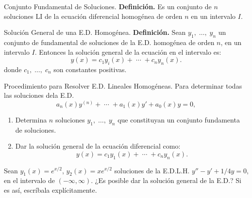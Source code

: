 \documentclass{beamer}
\begin{document}
\begin{frame}[t]
	\begin{block}{Conjunto Fundamental de Soluciones.}
		\textbf{Definición.} Es un conjunto de \(n\) soluciones LI de la ecuación diferencial homogénea de orden \(n\) en un intervalo \(I\).
	\end{block}
	\begin{block}{Solución General de una E.D. Homogénea.}
		\textbf{Definición.} Sean \(y_1, \;\ldots,\; y_n\) un conjunto de fundamental de soluciones de la E.D. homogénea de orden \(n\), en un intervalo \(I\). Entonces la solución general de la ecuación en el intervalo es:
		\[
			y(x) = c_1y_i(x) + \;\cdots\; +c_ny_n(x).
		\]
		donde \(c_1, \;\ldots,\; c_n\) son constantes positivas.
	\end{block}
\end{frame}

\begin{frame}[t]
	\begin{block}{Procedimiento para Resolver E.D. Lineales Homogéneas.}
		Para determinar todas las soluciones dela E.D.
		\[
			a_n(x) y^{(n)} + \;\cdots\; + a_1(x) y' +a_0(x) y =0,
		\]
		\vspace{-6mm}
		\begin{enumerate}
			\item Determina \(n\) soluciones \(y_1, \;\ldots,\; y_n\) que constituyan un conjunto fundamenta de soluciones.
			\item Dar la solución general de la ecuación diferencial como:
			\[
				y(x) = c_1y_1(x) + \;\cdots\; +c_ny_n(x).
			\]
		\end{enumerate}
	\end{block}
	\begin{example}
		Sean \(y_1(x) = e^{x/2}\), \(y_2(x) = xe^{x/2}\) soluciones de la E.D.L.H. \(y'' -y' +1/4y=0\),  en el intervalo de \((- \infty , \infty)\). ¿Es posible dar la solución general de la E.D.? Si es así, escríbala explícitamente.
	\end{example}
\end{frame}
\end{document}
